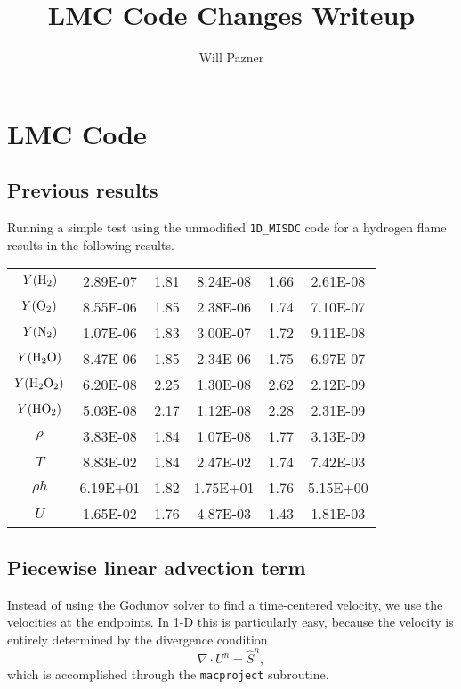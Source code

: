 \documentclass[12pt]{article}
\begin{document}
\title{LMC Code Changes Writeup}
\author{Will Pazner}
\maketitle

\section{LMC Code}
\subsection{Previous results}
Running a simple test using the unmodified \texttt{1D\_MISDC} code for a hydrogen flame 
results in the following results.\\

\begin{center}
\begin{tabular}{ c c c c c c }
$Y({\rm H}_2)$          & 2.89E-07 & 1.81 & 8.24E-08 & 1.66 & 2.61E-08 \\
$Y({\rm O}_2)$          & 8.55E-06 & 1.85 & 2.38E-06 & 1.74 & 7.10E-07 \\
$Y({\rm N}_2)$          & 1.07E-06 & 1.83 & 3.00E-07 & 1.72 & 9.11E-08 \\
$Y({\rm H}_2{\rm O})$   & 8.47E-06 & 1.85 & 2.34E-06 & 1.75 & 6.97E-07 \\
$Y({\rm H}_2{\rm O}_2)$ & 6.20E-08 & 2.25 & 1.30E-08 & 2.62 & 2.12E-09 \\
$Y({\rm HO}_2)$         & 5.03E-08 & 2.17 & 1.12E-08 & 2.28 & 2.31E-09 \\
$\rho$                  & 3.83E-08 & 1.84 & 1.07E-08 & 1.77 & 3.13E-09 \\
$T$                     & 8.83E-02 & 1.84 & 2.47E-02 & 1.74 & 7.42E-03 \\
$\rho h$                & 6.19E+01 & 1.82 & 1.75E+01 & 1.76 & 5.15E+00 \\
$U$                     & 1.65E-02 & 1.76 & 4.87E-03 & 1.43 & 1.81E-03 \\
\end{tabular}
\end{center}

\subsection{Piecewise linear advection term}
Instead of using the Godunov solver to find a time-centered velocity, we use 
the velocities at the endpoints. In 1-D this is particularly easy, because the 
velocity is entirely determined by the divergence condition
\begin{equation}
   \label{div-condn}
   \nabla \cdot U^n = \widehat{S}^n,
\end{equation}
which is accomplished through the \texttt{macproject} subroutine.
\end{document}
